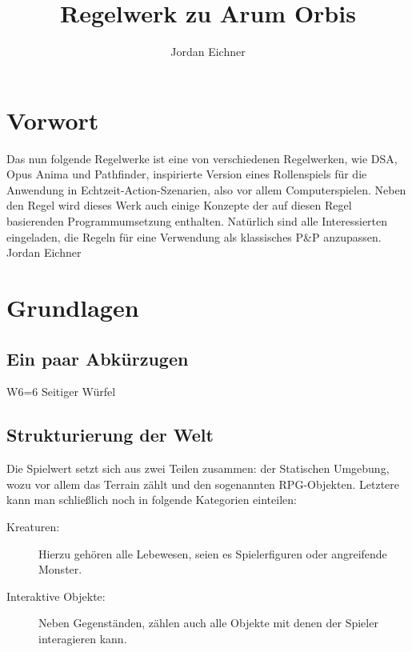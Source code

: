 \documentclass[a4paper,12pt,oneside]{book}
\author{Jordan Eichner}
\title{Regelwerk zu Arum Orbis}
\date{}
\begin{document}
\maketitle
\part*{Vorwort}
Das nun folgende Regelwerke ist eine von verschiedenen Regelwerken, wie DSA, Opus Anima und Pathfinder, inspirierte Version eines Rollenspiels für die Anwendung in Echtzeit-Action-Szenarien, also vor allem Computerspielen. Neben den Regel wird dieses Werk auch einige Konzepte der auf diesen Regel basierenden Programmumsetzung enthalten. Natürlich sind alle Interessierten eingeladen, die Regeln für eine Verwendung als klassisches P\&P anzupassen.
Jordan Eichner

\tableofcontents
  
\part{Grundlagen}
\chapter{Ein paar Abkürzugen}
W6=6 Seitiger Würfel

\chapter{Strukturierung der Welt}
Die Spielwert setzt sich aus zwei Teilen zusammen: der Statischen Umgebung, wozu vor allem das Terrain zählt und den sogenannten RPG-Objekten. Letztere kann man schließlich noch in folgende Kategorien einteilen:
\begin{description}
\item[Kreaturen:]
Hierzu gehören alle Lebewesen, seien es Spielerfiguren oder angreifende Monster.
\item[Interaktive Objekte:]
Neben Gegenständen, zählen auch alle Objekte mit denen der Spieler interagieren kann.
\end{description}
\end{document}
